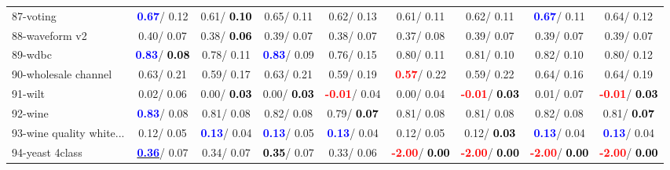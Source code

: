 \begin{table}[h]
\begin{center}
\begin{tabular}{lc|c|c|c|c|c|c|c}
87-voting & \textcolor{blue}{\textbf{  0.67}}/  0.12 &   0.61/\textcolor{black}{\textbf{  0.10}} &   0.65/  0.11 &   0.62/  0.13 &   0.61/  0.11 &   0.62/  0.11 & \textcolor{blue}{\textbf{  0.67}}/  0.11 &   0.64/  0.12 \\
88-waveform v2 &   0.40/  0.07 &   0.38/\textcolor{black}{\textbf{  0.06}} &   0.39/  0.07 &   0.38/  0.07 &   0.37/  0.08 &   0.39/  0.07 &   0.39/  0.07 &   0.39/  0.07 \\
89-wdbc & \textcolor{blue}{\textbf{  0.83}}/\textcolor{black}{\textbf{  0.08}} &   0.78/  0.11 & \textcolor{blue}{\textbf{  0.83}}/  0.09 &   0.76/  0.15 &   0.80/  0.11 &   0.81/  0.10 &   0.82/  0.10 &   0.80/  0.12 \\
90-wholesale channel &   0.63/  0.21 &   0.59/  0.17 &   0.63/  0.21 &   0.59/  0.19 & \textcolor{red}{\textbf{  0.57}}/  0.22 &   0.59/  0.22 &   0.64/  0.16 &   0.64/  0.19 \\
91-wilt &   0.02/  0.06 &   0.00/\textcolor{black}{\textbf{  0.03}} &   0.00/\textcolor{black}{\textbf{  0.03}} & \textcolor{red}{\textbf{ -0.01}}/  0.04 &   0.00/  0.04 & \textcolor{red}{\textbf{ -0.01}}/\textcolor{black}{\textbf{  0.03}} &   0.01/  0.07 & \textcolor{red}{\textbf{ -0.01}}/\textcolor{black}{\textbf{  0.03}} \\
92-wine & \textcolor{blue}{\textbf{  0.83}}/  0.08 &   0.81/  0.08 &   0.82/  0.08 &   0.79/\textcolor{black}{\textbf{  0.07}} &   0.81/  0.08 &   0.81/  0.08 &   0.82/  0.08 &   0.81/\textcolor{black}{\textbf{  0.07}} \\ \hline
93-wine quality white... &   0.12/  0.05 & \textcolor{blue}{\textbf{  0.13}}/  0.04 & \textcolor{blue}{\textbf{  0.13}}/  0.05 & \textcolor{blue}{\textbf{  0.13}}/  0.04 &   0.12/  0.05 &   0.12/\textcolor{black}{\textbf{  0.03}} & \textcolor{blue}{\textbf{  0.13}}/  0.04 & \textcolor{blue}{\textbf{  0.13}}/  0.04 \\
94-yeast 4class & \underline{\textcolor{blue}{\textbf{  0.36}}}/  0.07 &   0.34/  0.07 & \textcolor{black}{\textbf{  0.35}}/  0.07 &   0.33/  0.06 & \textcolor{red}{\textbf{ -2.00}}/\textcolor{black}{\textbf{  0.00}} & \textcolor{red}{\textbf{ -2.00}}/\textcolor{black}{\textbf{  0.00}} & \textcolor{red}{\textbf{ -2.00}}/\textcolor{black}{\textbf{  0.00}} & \textcolor{red}{\textbf{ -2.00}}/\textcolor{black}{\textbf{  0.00}} \\\end{tabular}\label{stratsALCKappa2bIELM}
\end{center}
\end{table}